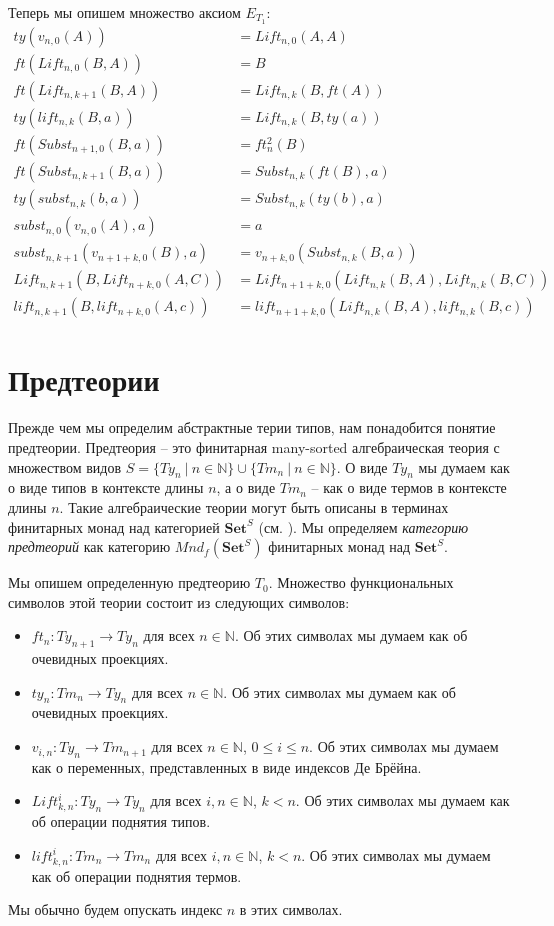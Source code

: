 \documentclass{amsart}
\theoremstyle{definition}
\theoremstyle{remark}
\newcommand{\cat}[1]{\mathbf{#1}}
\newcommand{\Set}{\cat{Set}}
\numberwithin{figure}{section}
\begin{document}
Теперь мы опишем множество аксиом $E_{T_1}$:
\begin{align*}
ty(v_{n,0}(A))                      & = Lift_{n,0}(A, A) \\
ft(Lift_{n,0}(B, A))                & = B \\
ft(Lift_{n,k+1}(B, A))              & = Lift_{n,k}(B, ft(A)) \\
ty(lift_{n,k}(B, a))                & = Lift_{n,k}(B, ty(a)) \\
ft(Subst_{n+1,0}(B, a))             & = ft^2_n(B) \\
ft(Subst_{n,k+1}(B, a))             & = Subst_{n,k}(ft(B), a) \\
ty(subst_{n,k}(b, a))               & = Subst_{n,k}(ty(b), a) \\
subst_{n,0}(v_{n,0}(A), a)          & = a \\
subst_{n,k+1}(v_{n+1+k,0}(B), a)    & = v_{n+k,0}(Subst_{n,k}(B, a)) \\
Lift_{n,k+1}(B, Lift_{n+k,0}(A, C)) & = Lift_{n+1+k,0}(Lift_{n,k}(B, A), Lift_{n,k}(B, C)) \\
lift_{n,k+1}(B, lift_{n+k,0}(A, c)) & = lift_{n+1+k,0}(Lift_{n,k}(B, A), lift_{n,k}(B, c))
\end{align*}

\section{Предтеории}

Прежде чем мы определим абстрактные терии типов, нам понадобится понятие предтеории.
Предтеория -- это финитарная many-sorted алгебраическая теория с множеством видов $S = \{ Ty_n\ |\ n \in \mathbb{N} \} \cup \{ Tm_n\ |\ n \in \mathbb{N} \}$.
О виде $Ty_n$ мы думаем как о виде типов в контексте длины $n$, а о виде $Tm_n$ -- как о виде термов в контексте длины $n$.
Такие алгебраические теории могут быть описаны в терминах финитарных монад над категорией $\Set^S$ (см. \cite{LPC}).
Мы определяем \emph{категорию предтеорий} как категорию $Mnd_f(\Set^S)$ финитарных монад над $\Set^S$.

Мы опишем определенную предтеорию $T_0$.
Множество функциональных символов этой теории состоит из следующих символов:
\begin{itemize}
\item $ft_n : Ty_{n+1} \to Ty_n$ для всех $n \in \mathbb{N}$. Об этих символах мы думаем как об очевидных проекциях.
\item $ty_n : Tm_n \to Ty_n$ для всех $n \in \mathbb{N}$. Об этих символах мы думаем как об очевидных проекциях.
\item $v_{i,n} : Ty_n \to Tm_{n+1}$ для всех $n \in \mathbb{N}$, $0 \leq i \leq n$. Об этих символах мы думаем как о переменных, представленных в виде индексов Де Брёйна.
\item $Lift^i_{k,n} : Ty_n \to Ty_n$ для всех $i, n \in \mathbb{N}$, $k < n$. Об этих символах мы думаем как об операции поднятия типов.
\item $lift^i_{k,n} : Tm_n \to Tm_n$ для всех $i, n \in \mathbb{N}$, $k < n$. Об этих символах мы думаем как об операции поднятия термов.
\end{itemize}
Мы обычно будем опускать индекс $n$ в этих символах.
\end{document}
